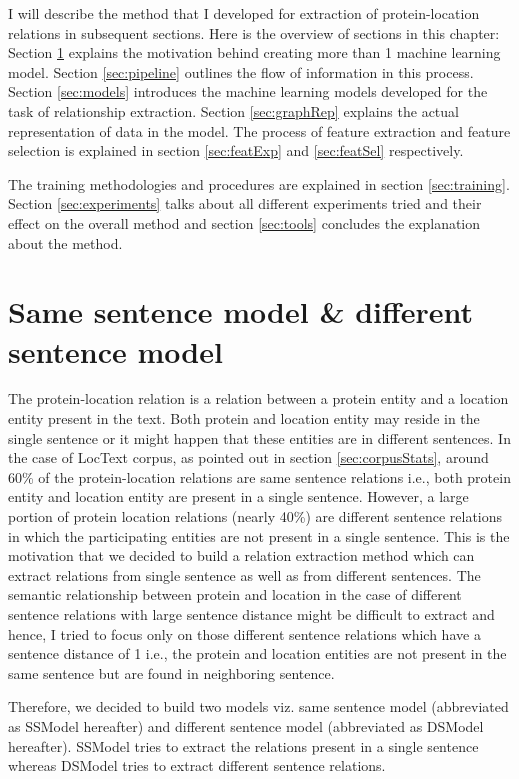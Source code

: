 I will describe the method that I developed for extraction of protein-location relations in subsequent sections. Here is the overview of sections in this chapter: Section \ref{sec:ssModeldsModel} explains the motivation behind creating more than 1 machine learning model. Section \ref{sec:pipeline} outlines the flow of information in this process. Section \ref{sec:models} introduces the machine learning models developed for the task of relationship extraction. Section \ref{sec:graphRep} explains the actual representation of data in the model. The process of feature extraction and feature selection is explained in section \ref{sec:featExp} and \ref{sec:featSel} respectively.

The training methodologies and procedures are explained in section \ref{sec:training}. Section \ref{sec:experiments} talks about all different experiments tried and their effect on the overall method and section \ref{sec:tools} concludes the explanation about the method.

\section{Same sentence model \& different sentence model}\label{sec:ssModeldsModel}

The protein-location relation is a relation between a protein entity and a location entity present in the text. Both protein and location entity may reside in the single sentence or it might happen that these entities are in different sentences. In the case of LocText corpus, as pointed out in section \ref{sec:corpusStats}, around 60\% of the protein-location relations are same sentence relations i.e., both protein entity and location entity are present in a single sentence. However, a large portion of protein location relations (nearly 40\%) are different sentence relations in which the participating entities are not present in a single sentence. This is the motivation that we decided to build a relation extraction method which can extract relations from single sentence as well as from different sentences. The semantic relationship between protein and location in the case of different sentence relations with large sentence distance might be difficult to extract and hence, I tried to focus only on those different sentence relations which have a sentence distance of 1 i.e., the protein and location entities are not present in the same sentence but are found in neighboring sentence.

Therefore, we decided to build two models viz. same sentence model (abbreviated as SSModel hereafter) and different sentence model (abbreviated as DSModel hereafter). SSModel tries to extract the relations present in a single sentence whereas DSModel tries to extract different sentence relations.

